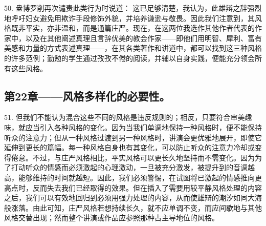 50. 盎博罗削再次谴责此类行为时说道： 这已足够清楚，我认为，此雄辩之辞强烈地呼吁妇女避免用欺诈手段修饰外貌，并培养谦逊与敬畏。因此我们注意到，其风格既非平实，亦非温和，而是通篇庄严。现在，在这两位我选作其他作者代表的作家中，以及在其他阐述真理且言辞优美的教会作家——即他们用明智、犀利、富有美感和力量的方式表述真理——，在其各类著作和讲道中，都可以找到这三种风格的许多范例；勤勉的学生通过孜孜不倦的阅读，并辅以自身实践，便能充分领会所有这些风格。\par


\subsection{第22章——风格多样化的必要性。}

51. 但我们不能认为混合这些不同的风格是违反规则的；相反，只要符合审美趣味，就应当引入各种风格的变化。因为当我们单调地保持一种风格时，便不能保持听众的注意力；但从一种风格过渡到另一种风格时，讲演会更优雅地展开，即使它延伸到更长的篇幅。每一种风格自身也有其变化，可以防止听众的注意力冷却或变得倦怠。不过，与庄严风格相比，平实风格可以更长久地坚持而不需变化。因为为了打动听众的情感而必须激起的心理激动，一旦被充分激发，被提升到的音调越高，能够维持的时间就越短。因此，我们必须警惕，在试图将已激起的情感推向更高点时，反而失去我们已经取得的效果。但在插入了需要用较平静风格处理的内容之后，我们可以有效地回归到必须用强力处理的内容，从而使雄辩的潮汐如同大海般涨落。由此可知，庄严风格若想持续长久，就不应单调不变，而应间歇地与其他风格交替出现；然而整个讲演或作品应参照那种占主导地位的风格。\par


